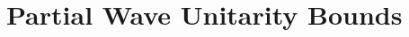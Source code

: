 \documentclass[prd,amsfonts,onecolumn,superscriptaddress,aps,nofootinbib,11pt]{revtex4-1}
\begin{document}

\section{Partial Wave Unitarity Bounds}
\label{appendix:unitarity}
\end{document}

